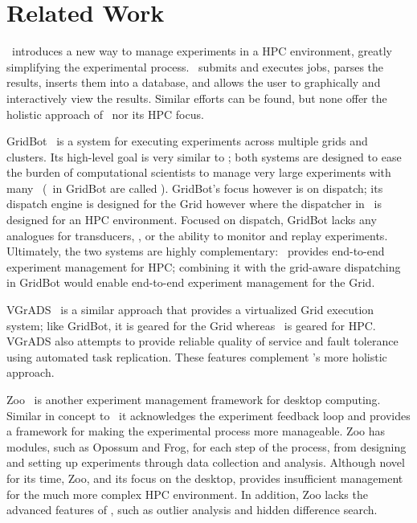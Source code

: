 \section{Related Work}
\label{related}

\name\ introduces a new way to manage experiments in a HPC environment, greatly
simplifying the experimental process.  \name\ submits and executes jobs, parses
the results, inserts them into a database, and allows the user to graphically
and interactively view the results. Similar efforts can be found, but none
offer the holistic approach of \name\ nor its HPC focus.

GridBot~\cite{gridbot} is a system for executing experiments across multiple
grids and clusters. Its high-level goal is very similar to \name; both systems
are designed to ease the burden of computational scientists to manage very
large experiments with many \subs\ (\subs\ in GridBot are called ). GridBot's focus however is on dispatch; its dispatch engine is
designed for the Grid however where the dispatcher in \name\ is designed for an
HPC environment.  Focused on dispatch, GridBot lacks any analogues for
transducers, \dbviz, or the ability to monitor and replay experiments.
Ultimately, the two systems are highly complementary: \name\ provides
end-to-end experiment management for HPC; combining it with the grid-aware
dispatching in GridBot would enable end-to-end experiment management for the
Grid.  

VGrADS~\cite{vgrads} is a similar approach that provides a virtualized Grid
execution system; like GridBot, it is geared for the Grid whereas \name\ is
geared for HPC. VGrADS also attempts to provide reliable quality of service and
fault tolerance using automated task replication.  These features complement
\name's more holistic approach.  

Zoo~\cite{livny-zoo} is another experiment management framework for desktop
computing.  Similar in concept to \name\, it acknowledges the experiment
feedback loop and provides a framework for making the experimental
process more manageable.  Zoo has modules, such as Opossum and Frog, for each step of the process, from designing and setting up experiments through data
collection and analysis.  Although novel for its time, Zoo, and its focus on
the desktop, provides insufficient management for the much more complex HPC
environment.  In addition, Zoo lacks the advanced features of \dbviz, such
as outlier analysis and hidden difference search.

